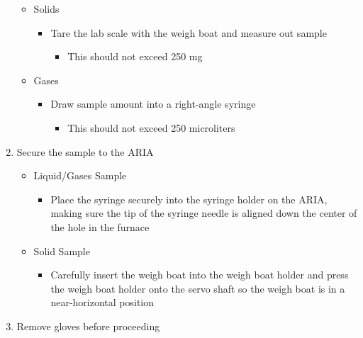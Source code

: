 \documentclass[letterpaper,11pt]{article}
\begin{document}
\begin{enumerate}
\begin{itemize}
        \item Solids
            \begin{itemize}
            \item Tare the lab scale with the weigh boat and measure out sample
                \begin{itemize}
                \item This should not exceed 250 mg
                \end{itemize}
            \end{itemize}
            
        \item Gases
            \begin{itemize}
            \item Draw sample amount into a right-angle syringe  
                \begin{itemize}
                \item This should not exceed 250 microliters
                \end{itemize}
            \end{itemize}
            
        \end{itemize}

     \item Secure the sample to the ARIA
        \begin{itemize}
        \item Liquid/Gases Sample
            \begin{itemize}
            \item Place the syringe securely into the syringe holder on the 
                ARIA, making sure the tip of the syringe 
                needle is aligned down the center of the hole in the furnace
            \end{itemize}
            
        \item Solid Sample
            \begin{itemize}
            \item Carefully insert the weigh boat into the weigh boat holder and
                press the weigh boat holder onto the servo shaft so the weigh 
                boat is in a near-horizontal position
            \end{itemize}
            
        \end{itemize}
            
    \item Remove gloves before proceeding
    

\end{enumerate}
\end{document}
